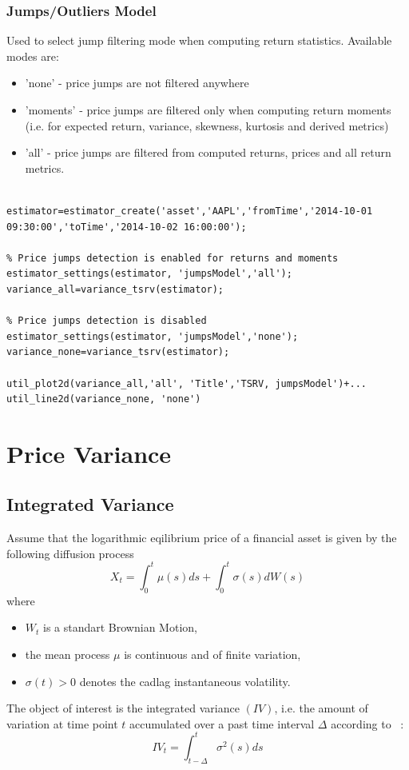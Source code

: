 \documentclass[letterpaper]{report}
\begin{document}
\subsection{Jumps/Outliers Model}
Used to select jump filtering mode when computing return statistics. Available modes are: 
\begin{itemize} 
  \item 'none' - price jumps are not filtered anywhere
  \item 'moments' - price jumps are filtered only when computing return moments
  (i.e. for expected return, variance, skewness, kurtosis and derived
  metrics)
  \item 'all' - price jumps are filtered from computed returns, prices and all
   return metrics.
\end{itemize}
\begin{lstlisting}

estimator=estimator_create('asset','AAPL','fromTime','2014-10-01 09:30:00','toTime','2014-10-02 16:00:00');

% Price jumps detection is enabled for returns and moments
estimator_settings(estimator, 'jumpsModel','all');
variance_all=variance_tsrv(estimator);

% Price jumps detection is disabled
estimator_settings(estimator, 'jumpsModel','none');
variance_none=variance_tsrv(estimator);

util_plot2d(variance_all,'all', 'Title','TSRV, jumpsModel')+...
util_line2d(variance_none, 'none')
\end{lstlisting}


\chapter{Price Variance}
\section{Integrated Variance}
Assume that the logarithmic eqilibrium price of a financial asset is given by the following
diffusion process
\begin{equation}
X_t = \int_0^t \mu(s)ds + \int_0^t \sigma(s)dW(s)
\end{equation}
where

\begin{itemize}
\item $W_t$ is a standart Brownian Motion,
\item the mean process $\mu$ is continuous and of finite variation,
\item $\sigma(t) >0$ denotes the cadlag instantaneous volatility.
\end{itemize}
\noindent The object of interest is the integrated variance $(IV)$, i.e. the
amount of variation at time point $t$ accumulated over a past time interval
$\Delta$ according to ~\cite[Pigorsch et al.]{Pigorsch_Pigorsch_Popov}:
\begin{equation}
IV_t = \int_{t-\Delta}^t \sigma^2(s)ds
\end{equation}
\end{document}
